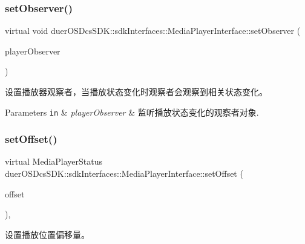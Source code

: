 \subsubsection{\texorpdfstring{set\+Observer()}{setObserver()}}
{\footnotesize\ttfamily virtual void duer\+O\+S\+Dcs\+S\+D\+K\+::sdk\+Interfaces\+::\+Media\+Player\+Interface\+::set\+Observer (\begin{DoxyParamCaption}\item[{std\+::shared\+\_\+ptr$<$ \hyperlink{classduerOSDcsSDK_1_1sdkInterfaces_1_1MediaPlayerObserverInterface}{Media\+Player\+Observer\+Interface} $>$}]{player\+Observer }\end{DoxyParamCaption})\hspace{0.3cm}{\ttfamily [pure virtual]}}



设置播放器观察者，当播放状态变化时观察者会观察到相关状态变化。 


\begin{DoxyParams}[1]{Parameters}
\mbox{\tt in}  & {\em player\+Observer} & 监听播放状态变化的观察者对象. \\
\hline
\end{DoxyParams}
\mbox{\label{classduerOSDcsSDK_1_1sdkInterfaces_1_1MediaPlayerInterface_aee790a88554e46581e17bcf0e1f8d2ec}} 
\subsubsection{\texorpdfstring{set\+Offset()}{setOffset()}}
{\footnotesize\ttfamily virtual Media\+Player\+Status duer\+O\+S\+Dcs\+S\+D\+K\+::sdk\+Interfaces\+::\+Media\+Player\+Interface\+::set\+Offset (\begin{DoxyParamCaption}\item[{std\+::chrono\+::milliseconds}]{offset }\end{DoxyParamCaption})\hspace{0.3cm}{\ttfamily [inline]}, {\ttfamily [virtual]}}



设置播放位置偏移量。 


